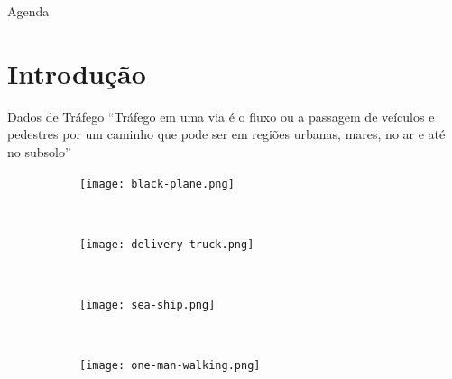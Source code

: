 
\customtitlepage

\showqrcode

\begin{frame}{Agenda}
  \overview
\end{frame}

\section{Introdução}

\begin{frame}{Dados de Tráfego}
  ``Tráfego em uma via é o fluxo ou a passagem de veículos e pedestres por um
caminho que pode ser em regiões urbanas, mares, no ar e até no subsolo''

\hfill \citep{Chen2015}

  \begin{figure}[h!]
    \centering
    \begin{subfigure}{0.20\textwidth}
      \centering
      \texttt{[image: black-plane.png]}
    \end{subfigure}
    ~
    \begin{subfigure}{0.20\textwidth}
      \centering
      \texttt{[image: delivery-truck.png]}
    \end{subfigure}
    ~
    \begin{subfigure}{0.20\textwidth}
      \centering
      \texttt{[image: sea-ship.png]}
    \end{subfigure}
    ~
    \begin{subfigure}{0.20\textwidth}
      \centering
      \texttt{[image: one-man-walking.png]}
    \end{subfigure}
  \end{figure}
\end{frame}

